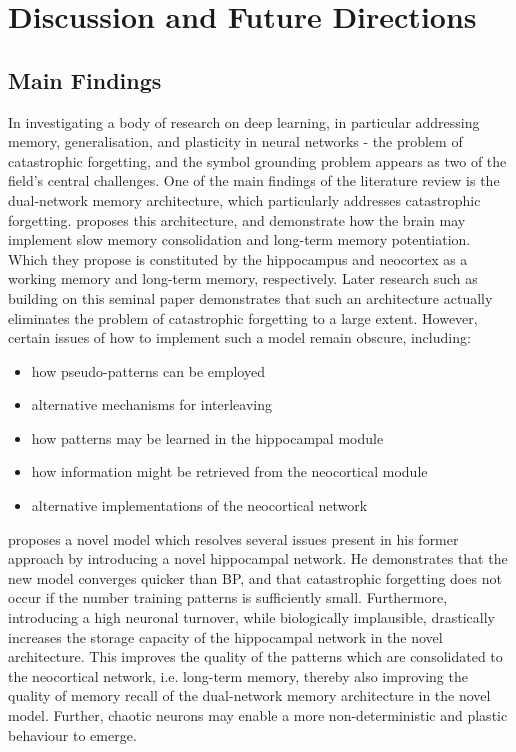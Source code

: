 
\chapter{Discussion and Future Directions}\label{chpt:future_work}
\section{Main Findings}


In investigating a body of research on deep learning, in particular addressing memory, generalisation, and plasticity in neural networks - the problem of catastrophic forgetting, and the symbol grounding problem appears as two of the field's central challenges. One of the main findings of the literature review is the dual-network memory architecture, which particularly addresses catastrophic forgetting. \cite{McClelland1995} proposes this architecture, and demonstrate how the brain may implement slow memory consolidation and long-term memory potentiation. Which they propose is constituted by the hippocampus and neocortex as a working memory and long-term memory, respectively. Later research such as \citep{French1997, Ans1997, Ans2000, French2001, Hattori2010, Hattori2014} building on this seminal paper demonstrates that such an architecture actually eliminates the problem of catastrophic forgetting to a large extent. However, certain issues of how to implement such a model remain obscure, including:
\begin{itemize}
\item how pseudo-patterns can be employed
\item alternative mechanisms for interleaving
\item how patterns may be learned in the hippocampal module
\item how information might be retrieved from the neocortical module
\item alternative implementations of the neocortical network
\end{itemize}

\cite{Hattori2014} proposes a novel model which resolves several issues present in his former approach by introducing a novel hippocampal network. He demonstrates that the new model converges quicker than BP, and that catastrophic forgetting does not occur if the number training patterns is sufficiently small. Furthermore, introducing a high neuronal turnover, while biologically implausible, drastically increases the storage capacity of the hippocampal network in the novel architecture. This improves the quality of the patterns which are consolidated to the neocortical network, i.e. long-term memory, thereby also improving the quality of memory recall of the dual-network memory architecture in the novel model. Further, chaotic neurons may enable a more non-deterministic and plastic behaviour to emerge.

